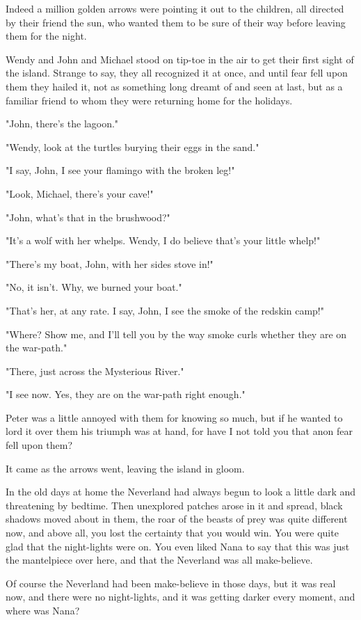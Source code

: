 Indeed a million golden arrows were pointing it out to the children, all directed by their friend the sun, who wanted them to be sure of their way before leaving them for the night.

Wendy and John and Michael stood on tip-toe in the air to get their first sight of the island.
Strange to say, they all recognized it at once, and until fear fell upon them they hailed it, not as something long dreamt of and seen at last, but as a familiar friend to whom they were returning home for the holidays.

"John, there's the lagoon."

"Wendy, look at the turtles burying their eggs in the sand."

"I say, John, I see your flamingo with the broken leg!"

"Look, Michael, there's your cave!"

"John, what's that in the brushwood?"

"It's a wolf with her whelps.
Wendy, I do believe that's your little whelp!"

"There's my boat, John, with her sides stove in!"

"No, it isn't.
Why, we burned your boat."

"That's her, at any rate.
I say, John, I see the smoke of the redskin camp!"

"Where?
Show me, and I'll tell you by the way smoke curls whether they are on the war-path."

"There, just across the Mysterious River."

"I see now.
Yes, they are on the war-path right enough."

Peter was a little annoyed with them for knowing so much, but if he wanted to lord it over them his triumph was at hand, for have I not told you that anon fear fell upon them?

It came as the arrows went, leaving the island in gloom.

In the old days at home the Neverland had always begun to look a little dark and threatening by bedtime.
Then unexplored patches arose in it and spread, black shadows moved about in them, the roar of the beasts of prey was quite different now, and above all, you lost the certainty that you would win.
You were quite glad that the night-lights were on.
You even liked Nana to say that this was just the mantelpiece over here, and that the Neverland was all make-believe.

Of course the Neverland had been make-believe in those days, but it was real now, and there were no night-lights, and it was getting darker every moment, and where was Nana?

